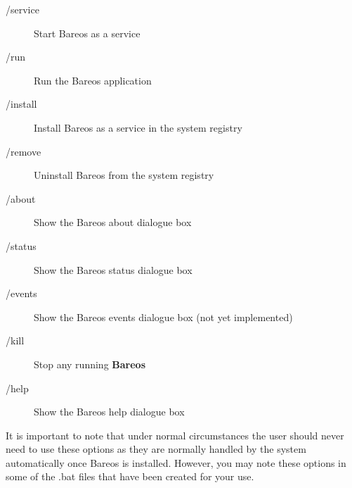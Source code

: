 \begin{description}

\item [/service ]
   Start Bareos as a service

\item [/run ]
   Run the Bareos application

\item [/install ]
   Install Bareos as a service in the system registry

\item [/remove ]
   Uninstall Bareos from the system registry

\item [/about ]
   Show the Bareos about dialogue box

\item [/status ]
   Show the Bareos status dialogue box

\item [/events ]
   Show the Bareos events dialogue box (not  yet implemented)

\item [/kill ]
   Stop any running {\bf Bareos}

\item [/help ]
   Show the Bareos help dialogue box
\end{description}

It is important to note that under normal circumstances the user should never
need to use these options as they are normally handled by the system
automatically once Bareos is installed. However, you may note these options in
some of the .bat files that have been created for your use.
